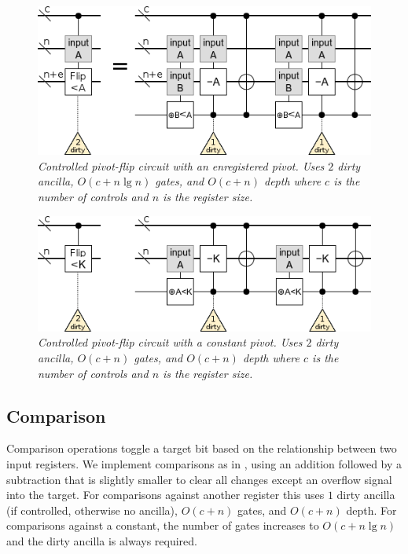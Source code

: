 \documentclass[twocolumn]{article}
\begin{document}
\begin{figure}
  \centering
  \includegraphics[width=\linewidth]{assets/controlled-pivot-flip.png}
  \caption{\em
    Controlled pivot-flip circuit with an enregistered pivot.
    Uses $2$ dirty ancilla, $O(c + n \lg n)$ gates, and $O(c + n)$ depth where $c$ is the number of controls and $n$ is the register size.
  }
  \label{fig:controlled-pivot-flip}
\end{figure}

\begin{figure}
  \centering
  \includegraphics[width=\linewidth]{assets/controlled-const-pivot-flip.png}
  \caption{\em
    Controlled pivot-flip circuit with a constant pivot.
    Uses $2$ dirty ancilla, $O(c + n)$ gates, and $O(c + n)$ depth where $c$ is the number of controls and $n$ is the register size.
  }
  \label{fig:controlled-pivot-flip}
\end{figure}


\subsection{Comparison}

Comparison operations toggle a target bit based on the relationship between two input registers.
We implement comparisons as in \cite{takahashi2005}, using an addition followed by a subtraction that is slightly smaller to clear all changes except an overflow signal into the target.
For comparisons against another register this uses $1$ dirty ancilla (if controlled, otherwise no ancilla), $O(c + n)$ gates, and $O(c + n)$ depth.
For comparisons against a constant, the number of gates increases to $O(c + n \lg n)$ and the dirty ancilla is always required.
\end{document}
